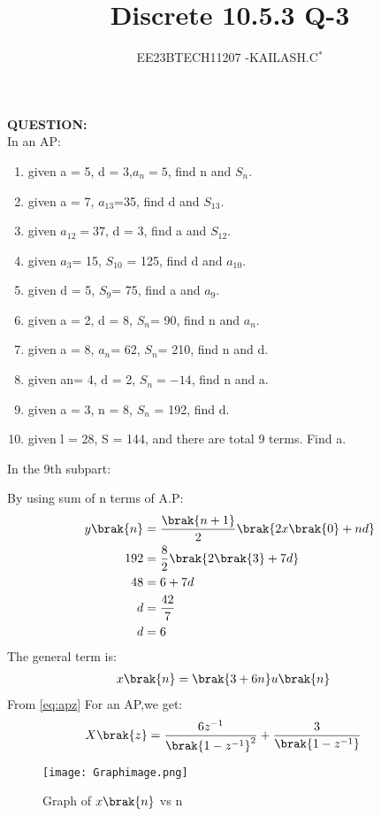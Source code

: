 \documentclass[journal,12pt,twocolumn]{IEEEtran}
\theoremstyle{remark}
\begin{document}

\vspace{3cm}

\title{Discrete 10.5.3 Q-3}
\author{EE23BTECH11207 -KAILASH.C$^{*}$%
}
\maketitle
\newpage
\bigskip

\renewcommand{\thefigure}{\theenumi}
\renewcommand{\thetable}{\theenumi}

\textbf{QUESTION:}\\
In an AP:
\begin{enumerate}
\item given a = 5, d = 3,$a_n=5$, find n and $S_n$.
\item given a = 7, $a_{13}$=35, find d and $S_{13}$.
\item given $a_{12}=37$, d = 3, find a and $S_{12}$.
\item given $a_3$= 15, $S_{10}$ = 125, find d and $a_{10}$.
\item given d = 5, $S_9$= 75, find a and $a_9$.
\item given a = 2, d = 8, $S_n$= 90, find n and $a_n$.
\item given a = 8, $a_n$= 62, $S_n$= 210, find n and d.
\item given an= 4, d = 2, $S_n=-14$, find n and a.
\item given a = 3, n = 8, $S_n$ = 192, find d.
\item given l = 28, S = 144, and there are total 9 terms. Find a.
\end{enumerate}
\solution 
In the 9th subpart:

By using sum of n terms of A.P:
\begin{align}
y\brak{n}&=\frac{\brak{n+1}}{2}\brak{2x\brak{0}+nd}\label{eq:105331}\\
 192&=\frac{8}{2}\brak{2\brak{3}+7d}\label{eq:105332}\\
 48&=6+7d\label{eq:105533}\\
 d&=\frac{42}{7}\label{eq:105334}\\
 d&=6\label{eq:105335}
\end{align}
The general term is:
\begin{align}
    x\brak{n}&=\brak{3+6n}u\brak{n}\label{eq:105336}
\end{align}
From \eqref{eq:apz} For an AP,we get:
\begin{align}
    X\brak{z}&=\frac{6z^{-1}}{\brak{1-z^{-1}}^2}+\frac{3}{\brak{1-z^{-1}}}\label{eq:105337}
\end{align}
\begin{figure}[h]
        \centering
\texttt{[image: Graphimage.png]}
\caption{Graph of $x\brak{n}$ vs n}
\label{fig:Fig10_5_3_3}
\end{figure}
\end{document}
